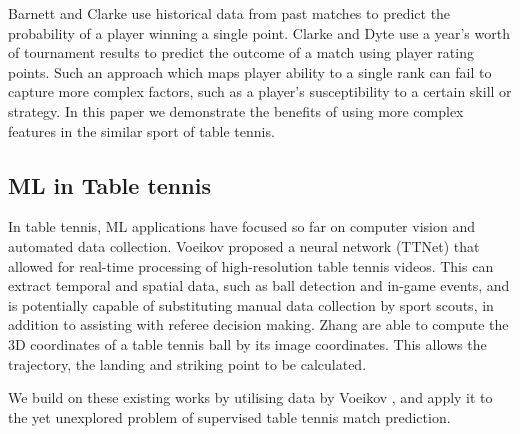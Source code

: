 Barnett and Clarke \cite{barnett2005combining} use historical data from past matches to predict the probability of a player winning a single point. Clarke and Dyte \cite{clarke2000using} use a year's worth of tournament results to predict the outcome of a match using player rating points. Such an approach which maps player ability to a single rank can fail to capture more complex factors, such as  a player's susceptibility to a certain skill or strategy. In this paper we demonstrate the benefits of using more complex features in the similar sport of table tennis.



\subsection{ML in Table tennis}
In table tennis, ML applications have focused so far on computer vision and automated data collection. %
Voeikov \etal \cite{voeikov2020ttnet} proposed a neural network (TTNet) that allowed for real-time processing of high-resolution table tennis videos. This can extract temporal and spatial data, such as ball detection and in-game events, and is potentially capable of substituting manual data collection by sport scouts, in addition to assisting with referee decision making. Zhang \etal \cite{zhang2010visual} are able to compute the 3D coordinates of a table tennis ball by its image coordinates. This allows the trajectory, the landing and striking point to be calculated.

We build on these existing works by utilising data by Voeikov \etal \cite{voeikov2020ttnet}, and apply it to the yet unexplored problem of supervised table tennis match prediction.



